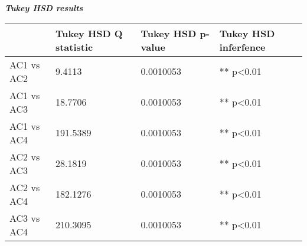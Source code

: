 \documentclass{article}
\begin{document}
	\textbf{\textit{Tukey HSD results}}
	\begin{table}[ht]
		\large
		\begin{tabular}{|l|l|l|l|}
			\hline
			 \text{Treatments  \newline  Pair} & Tukey HSD Q statistic & Tukey HSD  p-value & Tukey HSD  inferfence \\ \hline
			AC1 vs AC2                                                 & 9.4113                                                           & 0.0010053                                                    & ** p\textless{}0.01                                             \\ \hline
			AC1 vs AC3                                                 & 18.7706                                                          & 0.0010053                                                    & ** p\textless{}0.01                                             \\ \hline
			AC1 vs AC4                                                 & 191.5389                                                         & 0.0010053                                                    & ** p\textless{}0.01                                             \\ \hline
			AC2 vs AC3                                                 & 28.1819                                                          & 0.0010053                                                    & ** p\textless{}0.01                                             \\ \hline
			AC2 vs AC4                                                 & 182.1276                                                         & 0.0010053                                                    & ** p\textless{}0.01                                             \\ \hline
			AC3 vs AC4                                                 & 210.3095                                                         & 0.0010053                                                    & ** p\textless{}0.01                                             \\ \hline
		\end{tabular}
	\end{table}
\end{document}
